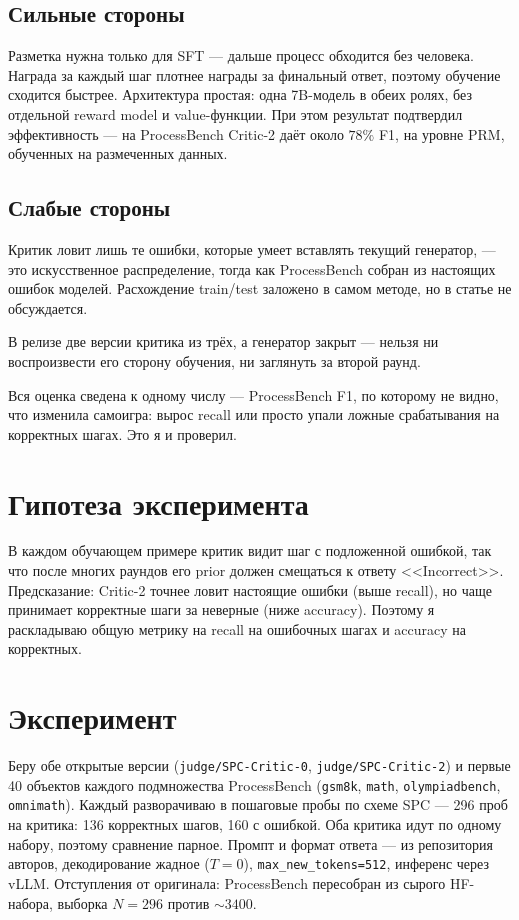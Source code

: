 \documentclass[11pt,a4paper]{article}
\begin{document}
\subsection*{Сильные стороны}

Разметка нужна только для SFT — дальше процесс обходится без человека. Награда за каждый шаг плотнее награды за финальный ответ, поэтому обучение сходится быстрее. Архитектура простая: одна 7B-модель в обеих ролях, без отдельной reward model и value-функции. При этом результат подтвердил эффективность — на ProcessBench Critic-2 даёт около $78\%$ F1, на уровне PRM, обученных на размеченных данных.

\subsection*{Слабые стороны}

Критик ловит лишь те ошибки, которые умеет вставлять текущий генератор, — это искусственное распределение, тогда как ProcessBench собран из настоящих ошибок моделей. Расхождение train/test заложено в самом методе, но в статье не обсуждается.

В релизе две версии критика из трёх, а генератор закрыт — нельзя ни воспроизвести его сторону обучения, ни заглянуть за второй раунд.

Вся оценка сведена к одному числу — ProcessBench F1, по которому не видно, что изменила самоигра: вырос recall или просто упали ложные срабатывания на корректных шагах. Это я и проверил.

\section*{Гипотеза эксперимента}

В каждом обучающем примере критик видит шаг с подложенной ошибкой, так что после многих раундов его prior должен смещаться к ответу <<Incorrect>>. Предсказание: Critic-2 точнее ловит настоящие ошибки (выше recall), но чаще принимает корректные шаги за неверные (ниже accuracy). Поэтому я раскладываю общую метрику на recall на ошибочных шагах и accuracy на корректных.

\section*{Эксперимент}

Беру обе открытые версии (\texttt{judge/SPC-Critic-0}, \texttt{judge/SPC-Critic-2}) и первые 40 объектов каждого подмножества ProcessBench (\texttt{gsm8k}, \texttt{math}, \texttt{olympiadbench}, \texttt{omnimath}). Каждый разворачиваю в пошаговые пробы по схеме SPC — 296 проб на критика: 136 корректных шагов, 160 с ошибкой. Оба критика идут по одному набору, поэтому сравнение парное. Промпт и формат ответа — из репозитория авторов, декодирование жадное ($T{=}0$), \texttt{max\_new\_tokens=512}, инференс через vLLM. Отступления от оригинала: ProcessBench пересобран из сырого HF-набора, выборка $N{=}296$ против ${\sim}3400$.
\end{document}
